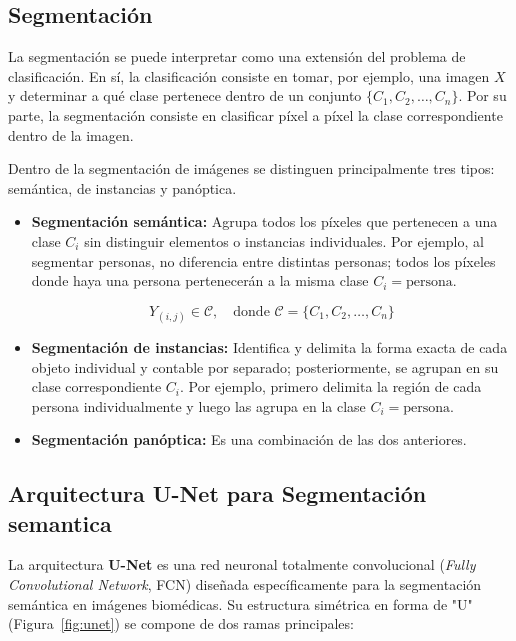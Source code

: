 \subsection{Segmentación}

La segmentación se puede interpretar como una extensión del problema de clasificación. En sí, la clasificación consiste en tomar, por ejemplo, una imagen $X$ y determinar a qué clase pertenece dentro de un conjunto $\{C_1, C_2, \dots, C_n\}$. Por su parte, la segmentación consiste en clasificar píxel a píxel la clase correspondiente dentro de la imagen.

Dentro de la segmentación de imágenes se distinguen principalmente tres tipos: semántica, de instancias y panóptica.

\begin{itemize}
    \item \textbf{Segmentación semántica:} Agrupa todos los píxeles que pertenecen a una clase $C_i$ sin distinguir elementos o instancias individuales. Por ejemplo, al segmentar personas, no diferencia entre distintas personas; todos los píxeles donde haya una persona pertenecerán a la misma clase $C_i = \text{persona}$.

    \begin{equation}
    Y_{(i,j)} \in \mathcal{C}, \quad \text{donde } \mathcal{C} = \{C_1, C_2, \dots, C_n\}
    \end{equation}


    \item \textbf{Segmentación de instancias:} Identifica y delimita la forma exacta de cada objeto individual y contable por separado; posteriormente, se agrupan en su clase correspondiente $C_i$. Por ejemplo, primero delimita la región de cada persona individualmente y luego las agrupa en la clase $C_i = \text{persona}$.

    \item \textbf{Segmentación panóptica:} Es una combinación de las dos anteriores.
\end{itemize}



\subsection{Arquitectura U-Net para Segmentación semantica}


La arquitectura \textbf{U-Net} \cite{unet2015} es una red neuronal totalmente convolucional (\textit{Fully Convolutional Network}, FCN) diseñada específicamente para la segmentación semántica en imágenes biomédicas. Su estructura simétrica en forma de "U" (Figura~\ref{fig:unet}) se compone de dos ramas principales:


